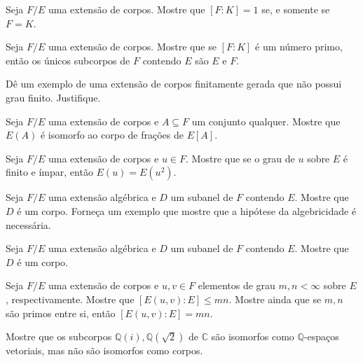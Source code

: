 \begin{exer}Seja $F/E$ uma extensão de corpos. Mostre que $[F:K]=1$ se, e somente se $F=K$.
\end{exer}
\begin{exer}Seja $F/E$ uma extensão de corpos. Mostre que se $[F:K]$ é um número primo, então os únicos subcorpos de $F$ contendo $E$ são $E$ e $F$.
\end{exer}
\begin{exer}Dê um exemplo de uma extensão de corpos finitamente gerada que não possui grau finito. Justifique.
\end{exer}
\begin{exer}Seja $F/E$ uma extensão de corpos e $A\subseteq F$ um conjunto qualquer. Mostre que $E(A)$ é isomorfo ao corpo de frações de $E[A]$.
\end{exer}
\begin{exer}Seja $F/E$ uma extensão de corpos e $u\in F$. Mostre que se o grau de $u$ sobre $E$ é finito e ímpar, então $E(u)=E(u^2)$.
\end{exer}
\begin{exer}Seja $F/E$ uma extensão algébrica e $D$ um subanel de $F$ contendo $E$. Mostre que $D$ é um corpo. Forneça um exemplo que mostre que a hipótese da algebricidade é necessária.
\end{exer}
\begin{exer}Seja $F/E$ uma extensão algébrica e $D$ um subanel de $F$ contendo $E$. Mostre que $D$ é um corpo.
\end{exer}
\begin{exer}
Seja $F/E$ uma extensão de corpos e $u, v \in F$ elementos de grau $m, n<\infty$ sobre $E$, respectivamente. Mostre que $[E(u, v):E]\leq mn$. Mostre ainda que se $m, n$ são primos entre si, então $[E(u, v):E]=mn$.
\end{exer}
\begin{exer}
Mostre que os subcorpos $\mathbb Q(i), \mathbb Q(\sqrt 2)$ de $\mathbb C$ são isomorfos como $\mathbb Q$-espaços vetoriais, mas não são isomorfos como corpos.
\end{exer}